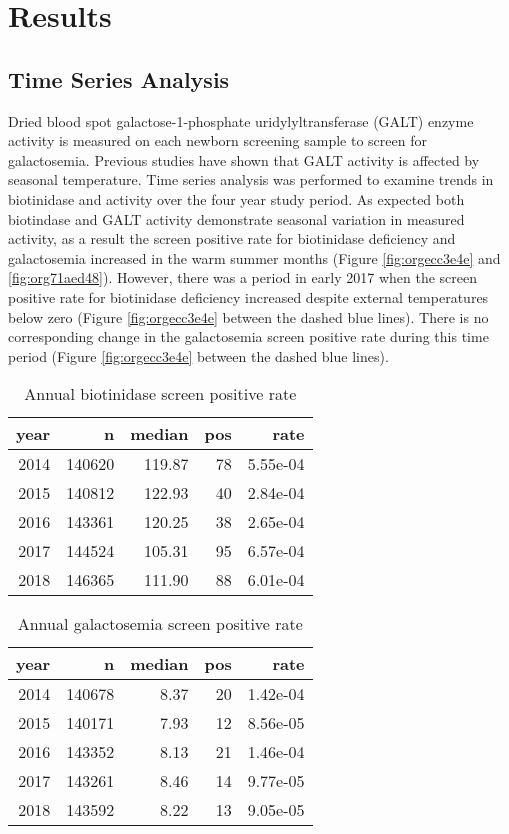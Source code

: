 \documentclass[review]{elsarticle}
\begin{document}
\section*{Results}
\label{sec:orgfa28b35}
\subsection*{Time Series Analysis}
\label{sec:orgaeabda7}
Dried blood spot galactose-1-phosphate uridylyltransferase (GALT)
enzyme activity is measured on each newborn screening sample to screen
for galactosemia. Previous studies have shown that GALT activity is
affected by seasonal temperature. Time series analysis was performed
to examine trends in biotinidase and activity over the four year study
period. As expected both biotindase and GALT activity demonstrate
seasonal variation in measured activity, as a result the screen
positive rate for biotinidase deficiency and galactosemia increased in
the warm summer months (Figure \ref{fig:orgecc3e4e} and \ref{fig:org71aed48}). However,
there was a period in early 2017 when the screen positive rate for
biotinidase deficiency increased despite external temperatures below
zero (Figure \ref{fig:orgecc3e4e} between the dashed blue lines). There is no
corresponding change in the galactosemia screen positive rate during
this time period (Figure \ref{fig:orgecc3e4e} between the dashed blue lines).

\begin{table}[ht]
\centering
\begin{tabular}{rrrrr}
  \hline
year & n & median & pos & rate \\ 
  \hline
2014 & 140620 & 119.87 &  78 & 5.55e-04 \\ 
  2015 & 140812 & 122.93 &  40 & 2.84e-04 \\ 
  2016 & 143361 & 120.25 &  38 & 2.65e-04 \\ 
  2017 & 144524 & 105.31 &  95 & 6.57e-04 \\ 
  2018 & 146365 & 111.90 &  88 & 6.01e-04 \\ 
   \hline
\end{tabular}
\caption{Annual biotinidase screen positive rate} 
\label{tab:biot_year}
\end{table}

\begin{table}[ht]
\centering
\begin{tabular}{rrrrr}
  \hline
year & n & median & pos & rate \\ 
  \hline
2014 & 140678 & 8.37 &  20 & 1.42e-04 \\ 
  2015 & 140171 & 7.93 &  12 & 8.56e-05 \\ 
  2016 & 143352 & 8.13 &  21 & 1.46e-04 \\ 
  2017 & 143261 & 8.46 &  14 & 9.77e-05 \\ 
  2018 & 143592 & 8.22 &  13 & 9.05e-05 \\ 
   \hline
\end{tabular}
\caption{Annual galactosemia screen positive rate} 
\label{tab:galt_year}
\end{table}
\end{document}
